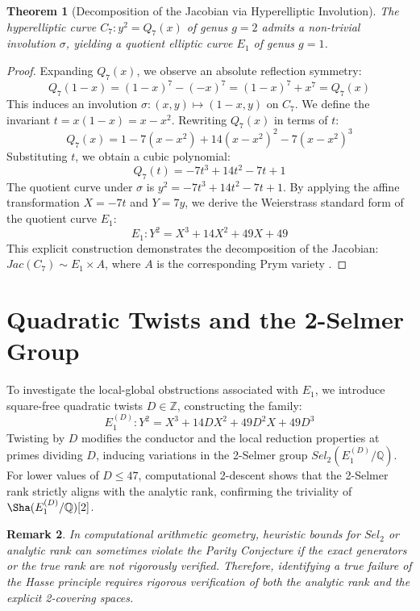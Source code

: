 \documentclass[11pt,a4paper]{article}
\newtheorem{theorem}{Theorem}[section]
\newtheorem{remark}[theorem]{Remark}
\begin{document}
\begin{theorem}[Decomposition of the Jacobian via Hyperelliptic Involution]
The hyperelliptic curve $C_7: y^2 = Q_7(x)$ of genus $g=2$ admits a non-trivial involution $\sigma$, yielding a quotient elliptic curve $E_1$ of genus $g=1$.
\end{theorem}
\begin{proof}
Expanding $Q_7(x)$, we observe an absolute reflection symmetry:
$$Q_7(1-x) = (1-x)^7 - (-x)^7 = (1-x)^7 + x^7 = Q_7(x)$$
This induces an involution $\sigma: (x,y) \mapsto (1-x, y)$ on $C_7$. We define the invariant $t = x(1-x) = x - x^2$. Rewriting $Q_7(x)$ in terms of $t$:
$$Q_7(x) = 1 - 7(x-x^2) + 14(x-x^2)^2 - 7(x-x^2)^3$$
Substituting $t$, we obtain a cubic polynomial:
$$Q_7(t) = -7t^3 + 14t^2 - 7t + 1$$
The quotient curve under $\sigma$ is $y^2 = -7t^3 + 14t^2 - 7t + 1$. By applying the affine transformation $X = -7t$ and $Y = 7y$, we derive the Weierstrass standard form of the quotient curve $E_1$:
$$E_1: Y^2 = X^3 + 14X^2 + 49X + 49$$
This explicit construction demonstrates the decomposition of the Jacobian: $Jac(C_7) \sim E_1 \times A$, where $A$ is the corresponding Prym variety \cite{CasselsFlynn}.
\end{proof}

\section{Quadratic Twists and the 2-Selmer Group}

To investigate the local-global obstructions associated with $E_1$, we introduce square-free quadratic twists $D \in \mathbb{Z}$, constructing the family:
$$E_1^{(D)}: Y^2 = X^3 + 14DX^2 + 49D^2X + 49D^3$$
Twisting by $D$ modifies the conductor and the local reduction properties at primes dividing $D$, inducing variations in the 2-Selmer group $Sel_2(E_1^{(D)}/\mathbb{Q})$. For lower values of $D \le 47$, computational 2-descent shows that the 2-Selmer rank strictly aligns with the analytic rank, confirming the triviality of $\Sha(E_1^{(D)}/\mathbb{Q})[2]$. 

\begin{remark}
In computational arithmetic geometry, heuristic bounds for $Sel_2$ or analytic rank can sometimes violate the Parity Conjecture if the exact generators or the true rank are not rigorously verified. Therefore, identifying a true failure of the Hasse principle requires rigorous verification of both the analytic rank and the explicit 2-covering spaces.
\end{remark}
\end{document}
